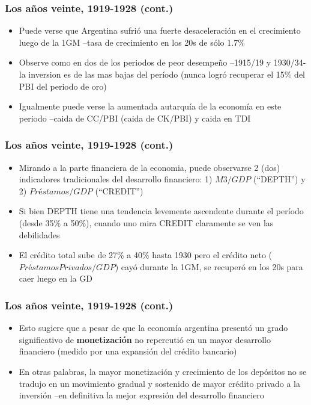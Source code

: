 \documentclass[14pt,aspectratio=169]{beamer}
\begin{document}
\begin{frame}\frametitle{Los años veinte, 1919-1928 (cont.)}
    \begin{itemize}\itemsep 10pt
      \item Puede verse que Argentina sufrió una fuerte desaceleración
        en el crecimiento luego de la 1GM --tasa de crecimiento en los
        20s de sólo 1.7\%
        \item Observe como en dos de los periodos de peor desempeño
          --1915/19 y 1930/34- la inversion es de las mas bajas del
          período (nunca logró recuperar el 15\% del PBI del periodo
          de oro)
          \item Igualmente puede verse la aumentada autarquía de la
            economía en este periodo --caida de CC/PBI (caida de
            CK/PBI) y caida en TDI
                   \end{itemize}
      \end{frame}


      \begin{frame}\frametitle{Los años veinte, 1919-1928 (cont.)}
    \begin{itemize}\itemsep 10pt
      \item Mirando a la parte financiera de la economia, puede
        observarse 2 (dos) indicadores tradicionales del desarrollo
        financiero: 1) $M3/GDP$ (``DEPTH'') y 2) $Préstamos/GDP$
        (``CREDIT'')
        \item Si bien DEPTH tiene una tendencia levemente ascendente
          durante el período (desde 35\% a 50\%), cuando uno mira
          CREDIT claramente se ven las debilidades
          \item El crédito total sube de 27\% a 40\% hasta 1930 pero
            el crédito neto ($PréstamosPrivados/GDP$) cayó durante la
            1GM, se recuperó en los 20s para caer luego en la GD
                   \end{itemize}
      \end{frame}


       \begin{frame}\frametitle{Los años veinte, 1919-1928 (cont.)}
    \begin{itemize}\itemsep 10pt
      \item Esto sugiere que a pesar de que la economía argentina
        presentó un grado significativo de \textbf{monetización} no
        repercutió en un mayor desarrollo financiero (medido por una
        expansión del crédito bancario)
        \item En otras palabras, la mayor monetización y crecimiento
          de los depósitos no se tradujo en un movimiento gradual y
          sostenido de mayor crédito privado a la inversión --en
          definitiva la mejor expresión del desarrollo financiero
                   \end{itemize}
      \end{frame}
      
\end{document}
